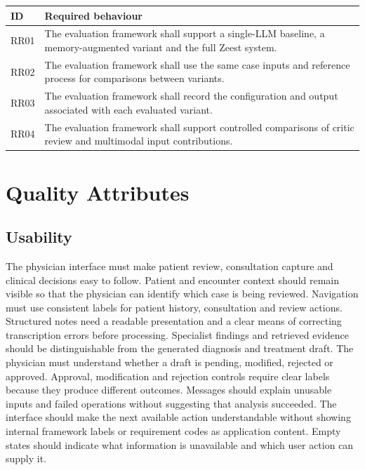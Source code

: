 \begin{reporttable}
\centering
\small
\caption{Research requirements for comparing the contribution of system components.}
\label{tab:kashaf:research-requirements}
\begin{tabular}{|p{}|p{}|}
\hline
ID & Required behaviour \\ \hline
RR01 & The evaluation framework shall support a single-LLM baseline, a memory-augmented variant and the full Zeest system. \\ \hline
RR02 & The evaluation framework shall use the same case inputs and reference process for comparisons between variants. \\ \hline
RR03 & The evaluation framework shall record the configuration and output associated with each evaluated variant. \\ \hline
RR04 & The evaluation framework shall support controlled comparisons of critic review and multimodal input contributions. \\ \hline
\end{tabular}
\end{reporttable}


\section{Quality Attributes}

\subsection{Usability}

The physician interface must make patient review, consultation capture and clinical decisions easy to follow. Patient and encounter context should remain visible so that the physician can identify which case is being reviewed. Navigation must use consistent labels for patient history, consultation and review actions. Structured notes need a readable presentation and a clear means of correcting transcription errors before processing. Specialist findings and retrieved evidence should be distinguishable from the generated diagnosis and treatment draft. The physician must understand whether a draft is pending, modified, rejected or approved. Approval, modification and rejection controls require clear labels because they produce different outcomes. Messages should explain unusable inputs and failed operations without suggesting that analysis succeeded. The interface should make the next available action understandable without showing internal framework labels or requirement codes as application content. Empty states should indicate what information is unavailable and which user action can supply it.

